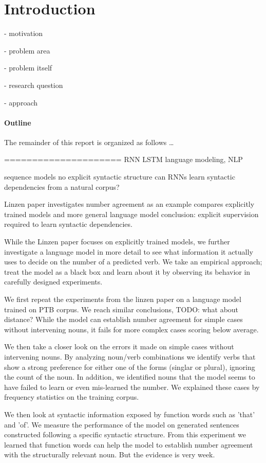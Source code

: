\section{Introduction}
- motivation

- problem area

- problem itself

- research question

- approach

\paragraph{Outline}
The remainder of this report is organized as follows \ldots

=====================
RNN
LSTM
language modeling, NLP

sequence models
no explicit syntactic structure
can RNNs learn syntactic dependencies from a natural corpus?

Linzen paper investigates number agreement as an example
compares explicitly trained models and more general language model
conclusion: explicit supervision required to learn syntactic dependencies.


While the Linzen paper focuses on explicitly
trained models, we further investigate a language model
in more detail to see what information it
actually uses to decide on the number of a predicted verb.
We take an empirical approach;
treat the model as a black box
and learn about it
by observing its behavior
in carefully designed experiments.

We first repeat the experiments from the linzen paper
on a language model trained on PTB corpus.
We reach similar conclusions,
TODO: what about distance?
While the model can establish number agreement
for simple cases without intervening nouns,
it fails for more complex cases scoring below average.

We then take a closer look on the errors
it made on simple cases without intervening nouns.
By analyzing noun/verb combinations
we identify verbs that show a strong preference for either
one of the forms (singlar or plural),
ignoring the count of the noun.
In addition, we identified nouns that
the model seems to have failed to learn or even mis-learned
the number.
We explained these cases by frequency statistics on the training corpus.

We then look at syntactic information exposed 
by function words such as 'that' and 'of'.
We measure the performance of the model on 
generated sentences constructed following a specific
syntactic structure. 
From this experiment we learned that
function words can help the model to establish
number agreement with the structurally relevant noun.
But the evidence is very week.

